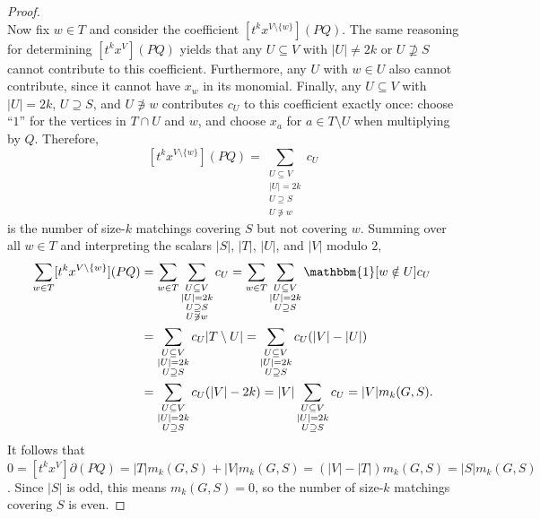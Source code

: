 \documentclass[10pt,a4paper]{amsart}
\begin{document}
\begin{proof}
\[    \]
    Now fix $w\in T$ and consider the coefficient $[t^kx^{V\setminus\{w\}}](PQ)$. The same reasoning for determining $[t^k x^V](PQ)$ yields that any $U\subseteq V$ with $|U| \neq 2k$ or $U\not\supseteq S$ cannot contribute to this coefficient. Furthermore, any $U$ with $w\in U$ also cannot contribute, since it cannot have $x_w$ in its monomial. Finally, any $U\subseteq V$ with $|U|=2k$, $U\supseteq S$, and $U\not\ni w$ contributes $c_U$ to this coefficient exactly once: choose ``$1$'' for the vertices in $T\cap U$ and $w$, and choose $x_a$ for $a\in T\setminus U$ when multiplying by $Q$. Therefore, 
    \[
        [t^kx^{V\setminus\{w\}}](P Q) = \sum_{\substack{U\subseteq V\\|U|=2k\\U\supseteq S\\U\not\ni w}} c_U
    \]
    is the number of size-$k$ matchings covering $S$ but not covering $w$. Summing over all $w\in T$ and interpreting the scalars $|S|$, $|T|$, $|U|$, and $|V|$ modulo $2$,
        \begin{align*}
        \sum_{w\in T}[t^kx^{V\setminus\{w\}}](P Q) &= \sum_{w\in T}\sum_{\substack{U\subseteq V\\|U|=2k\\U\supseteq S\\U\not\ni w}} c_U = \sum_{w\in T}\sum_{\substack{U\subseteq V\\|U|=2k\\U\supseteq S}} \mathbbm{1}[w\notin U]c_U\\
        &= \sum_{\substack{U\subseteq V\\|U|=2k\\U\supseteq S}}c_U|T\setminus U| = \sum_{\substack{U\subseteq V\\|U|=2k\\U\supseteq S}}c_U(|V|-|U|)\\
        &= \sum_{\substack{U\subseteq V\\|U|=2k\\U\supseteq S}}c_U(|V|-2k) = |V|\sum_{\substack{U\subseteq V\\|U|=2k\\U\supseteq S}}c_U = |V|m_k(G, S).
    \end{align*}
    It follows that $0 = [t^kx^V]\partial(P Q) = |T|m_k(G, S) + |V|m_k(G, S) = (|V|-|T|)m_k(G,S) = |S|m_k(G,S)$. Since $|S|$ is odd, this means $m_k(G,S) = 0$, so the number of size-$k$ matchings covering $S$ is even.
\end{proof}
\end{document}
